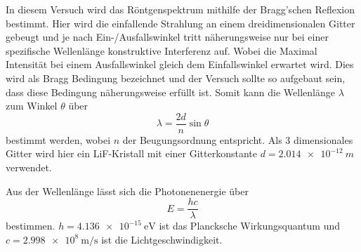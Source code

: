 In diesem Versuch wird das Röntgenspektrum mithilfe der Bragg'schen Reflexion bestimmt.
Hier wird die einfallende Strahlung an einem dreidimensionalen Gitter gebeugt und je nach Ein-/Ausfallswinkel tritt näherungsweise nur bei einer spezifische Wellenlänge konstruktive Interferenz auf. 
Wobei die Maximal Intensität bei einem Ausfallswinkel gleich dem Einfallswinkel erwartet wird.
Dies wird als Bragg Bedingung bezeichnet und der Versuch sollte so aufgebaut sein, dass diese Bedingung näherungsweise erfüllt ist.
Somit kann die Wellenlänge $\lambda$ zum Winkel $\theta$ über
\begin{equation}
    \lambda = \frac{2d}{n}\sin\theta
    \label{eq:bragg}
\end{equation}
bestimmt werden, wobei $n$ der Beugungsordnung entspricht.
Als 3 dimensionales Gitter wird hier ein LiF-Kristall mit einer Gitterkonstante $d=\SI{2.014e-12}{m}$ verwendet.

Aus der Wellenlänge lässt sich die Photonenenergie über
\begin{equation}
    E = \frac{hc}{\lambda}
    \label{eq:energie}
\end{equation}
bestimmen. 
$h=\SI{4.136e-15}{\electronvolt}$ ist das Plancksche Wirkungsquantum und $c=\SI{2.998e8}{\metre\per\second}$ ist die Lichtgeschwindigkeit.\cite{physics_constants}